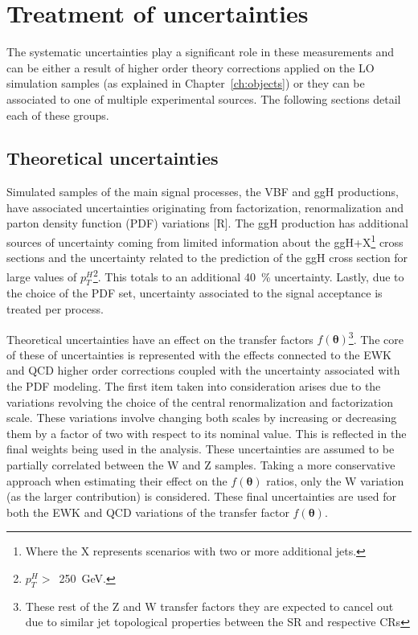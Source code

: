 



\section{Treatment of uncertainties}
\hspace{10pt} The systematic uncertainties play a significant role in these measurements and can be either a result of higher order theory corrections applied on the LO simulation samples (as explained in Chapter~\ref{ch:objects}) or they can be associated to one of multiple experimental sources. The following sections detail each of these groups.

\subsection{Theoretical uncertainties}
\hspace{10pt} Simulated samples of the main signal processes, the VBF and ggH productions, have associated uncertainties originating from factorization, renormalization and parton density function (PDF) variations [R]. The ggH production has additional sources of uncertainty coming from limited information about the ggH+X\footnote{Where the X represents scenarios with two or more additional jets.} cross sections and the uncertainty related to the prediction of the ggH cross section for large values of $p_T^{H}$\footnote{$p_T^{H}>$~250~GeV.}. This totals to an additional 40~\% uncertainty. Lastly, due to the choice of the PDF set, uncertainty associated to the signal acceptance is treated per process.

\hspace{10pt} Theoretical uncertainties have an effect on the transfer factors $f(\boldsymbol{\theta})$\footnote{These rest of the Z and W transfer factors they are expected to cancel out due to similar jet topological properties between the SR and respective CRs}. The core of these of uncertainties is represented with the effects connected to the EWK and QCD higher order corrections coupled with the uncertainty associated with the PDF modeling. The first item taken into consideration arises due to the variations revolving the choice of the central renormalization and factorization scale. These variations involve changing both scales by increasing or decreasing them by a factor of two with respect to its nominal value. This is reflected in the final weights being used in the analysis. These uncertainties are assumed to be partially correlated between the W and Z samples. Taking a more conservative approach when estimating their effect on the $f(\boldsymbol{\theta})$ ratios, only the W variation (as the larger contribution) is considered. These final uncertainties are used for both the EWK and QCD variations of the transfer factor $f(\boldsymbol{\theta})$.

